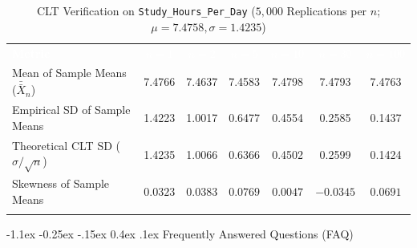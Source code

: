 \documentclass[11pt,a4paper]{article}
\makeatletter
\newcommand{\hd}[1]{\textcolor{white}{\textbf{#1}}}
\renewcommand{\arraystretch}{1.04}
\renewcommand\section{\@startsection {section}{1}{\z@}%
                                   {-1.1ex \@plus -0.25ex \@minus -.15ex}%
                                   {0.4ex \@plus.1ex}%
                                   {\normalfont\large\bfseries\color{accent}}}
\makeatother
\begin{document}
\begin{table}[!htbp]
\centering
\caption{CLT Verification on \texttt{Study\_Hours\_Per\_Day} ($5,000$ Replications per $n$; $\mu = 7.4758, \sigma = 1.4235$)}
\label{tab:clt}
\footnotesize
\renewcommand{\arraystretch}{1.08}
\setlength{\tabcolsep}{5pt}
\begin{tabularx}{\textwidth}{>{\raggedright\arraybackslash}X c c c c c c}
\arrayrulecolor{accent}\toprule[1.2pt]
\rowcolor{accent}
\hd{Metric} & \hd{$n = 1$} & \hd{$n = 2$} & \hd{$n = 5$} & \hd{$n = 10$} & \hd{$n = 30$} & \hd{$n = 100$} \\
\arrayrulecolor{accent!40}\midrule
Mean of Sample Means ($\bar{\bar{X}}_n$) & 7.4766 & 7.4637 & 7.4583 & 7.4798 & 7.4793 & 7.4763 \\
\rowcolor{accent!5}
Empirical SD of Sample Means & 1.4223 & 1.0017 & 0.6477 & 0.4554 & 0.2585 & 0.1437 \\
\rowcolor{accent!5}
Theoretical CLT SD ($\sigma/\sqrt{n}$) & 1.4235 & 1.0066 & 0.6366 & 0.4502 & 0.2599 & 0.1424 \\
Skewness of Sample Means & $0.0323$ & $0.0383$ & $0.0769$ & $0.0047$ & $-0.0345$ & $0.0691$ \\
\arrayrulecolor{accent}\bottomrule[1.2pt]
\end{tabularx}
\end{table}

\newpage
\section{Frequently Answered Questions (FAQ)}
\end{document}
